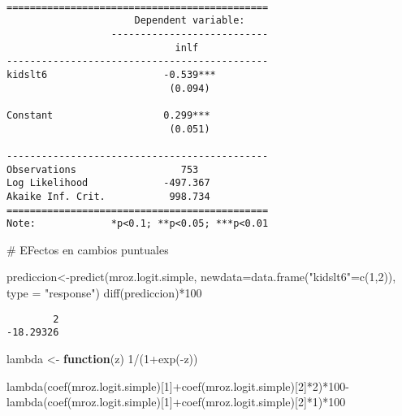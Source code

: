 \documentclass[
  letterpaper,
  DIV=11,
  numbers=noendperiod]{scrreprt}
\newenvironment{Shaded}{\begin{snugshade}}{\end{snugshade}}
\newcommand{\AttributeTok}[1]{\textcolor[rgb]{0.40,0.45,0.13}{#1}}
\newcommand{\CommentTok}[1]{\textcolor[rgb]{0.37,0.37,0.37}{#1}}
\newcommand{\ControlFlowTok}[1]{\textcolor[rgb]{0.00,0.23,0.31}{\textbf{#1}}}
\newcommand{\DecValTok}[1]{\textcolor[rgb]{0.68,0.00,0.00}{#1}}
\newcommand{\FunctionTok}[1]{\textcolor[rgb]{0.28,0.35,0.67}{#1}}
\newcommand{\NormalTok}[1]{\textcolor[rgb]{0.00,0.23,0.31}{#1}}
\newcommand{\OtherTok}[1]{\textcolor[rgb]{0.00,0.23,0.31}{#1}}
\newcommand{\SpecialCharTok}[1]{\textcolor[rgb]{0.37,0.37,0.37}{#1}}
\newcommand{\StringTok}[1]{\textcolor[rgb]{0.13,0.47,0.30}{#1}}
\begin{document}
\begin{verbatim}

=============================================
                      Dependent variable:    
                  ---------------------------
                             inlf            
---------------------------------------------
kidslt6                    -0.539***         
                            (0.094)          
                                             
Constant                   0.299***          
                            (0.051)          
                                             
---------------------------------------------
Observations                  753            
Log Likelihood             -497.367          
Akaike Inf. Crit.           998.734          
=============================================
Note:             *p<0.1; **p<0.05; ***p<0.01
\end{verbatim}

\begin{Shaded}
\begin{Highlighting}[]
\CommentTok{\# EFectos en cambios puntuales}

\NormalTok{prediccion}\OtherTok{\textless{}{-}}\FunctionTok{predict}\NormalTok{(mroz.logit.simple,}
                    \AttributeTok{newdata=}\FunctionTok{data.frame}\NormalTok{(}\StringTok{"kidslt6"}\OtherTok{=}\FunctionTok{c}\NormalTok{(}\DecValTok{1}\NormalTok{,}\DecValTok{2}\NormalTok{)),}
                    \AttributeTok{type =} \StringTok{"response"}\NormalTok{)}
\FunctionTok{diff}\NormalTok{(prediccion)}\SpecialCharTok{*}\DecValTok{100}
\end{Highlighting}
\end{Shaded}

\begin{verbatim}
        2 
-18.29326 
\end{verbatim}

\begin{Shaded}
\begin{Highlighting}[]
\NormalTok{lambda }\OtherTok{\textless{}{-}} \ControlFlowTok{function}\NormalTok{(z) }\DecValTok{1}\SpecialCharTok{/}\NormalTok{(}\DecValTok{1}\SpecialCharTok{+}\FunctionTok{exp}\NormalTok{(}\SpecialCharTok{{-}}\NormalTok{z))}

\FunctionTok{lambda}\NormalTok{(}\FunctionTok{coef}\NormalTok{(mroz.logit.simple)[}\DecValTok{1}\NormalTok{]}\SpecialCharTok{+}\FunctionTok{coef}\NormalTok{(mroz.logit.simple)[}\DecValTok{2}\NormalTok{]}\SpecialCharTok{*}\DecValTok{2}\NormalTok{)}\SpecialCharTok{*}\DecValTok{100}\SpecialCharTok{{-}}\FunctionTok{lambda}\NormalTok{(}\FunctionTok{coef}\NormalTok{(mroz.logit.simple)[}\DecValTok{1}\NormalTok{]}\SpecialCharTok{+}\FunctionTok{coef}\NormalTok{(mroz.logit.simple)[}\DecValTok{2}\NormalTok{]}\SpecialCharTok{*}\DecValTok{1}\NormalTok{)}\SpecialCharTok{*}\DecValTok{100}
\end{Highlighting}
\end{Shaded}
\end{document}
